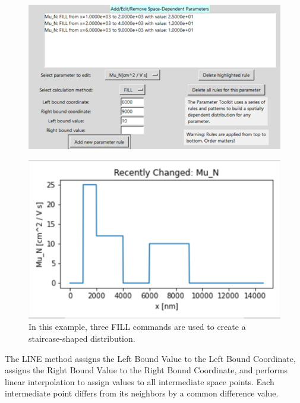 \documentclass[11pt,letterpaper,titlepage]{article}
\begin{document}
		\begin{figure}[H]
			\label{fig:ptoolkit_fill}
			\centering
			\includegraphics[scale=1]{"ptoolkit_fill"}
		\end{figure}
		\begin{figure}[H]
			\label{fig:ptoolkit_fill_plot}
			\centering
			\includegraphics[scale=1]{"ptoolkit_fill_plot"}
			\caption{In this example, three FILL commands are used to create a staircase-shaped distribution.}
		\end{figure}
		
		\par The LINE method assigns the Left Bound Value to the Left Bound Coordinate, assigns the Right Bound Value to the Right Bound Coordinate, and performs linear interpolation to assign values to all intermediate space points. Each intermediate point differs from its neighbors by a common difference value.
		
\end{document}
